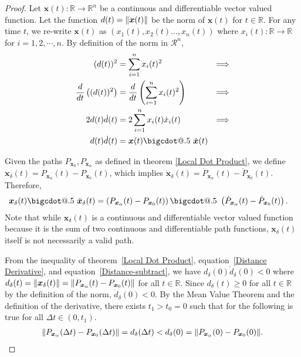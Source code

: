 \documentclass{article}
\makeatletter
\newcommand{\B}[1]{\boldsymbol{#1}}
\newcommand*\bigcdot{\mathpalette\bigcdot@{.5}}
\newcommand*\bigcdot@[2]{\mathbin{\vcenter{\hbox{\scalebox{#2}{$\m@th#1\bullet$}}}}}
\DeclarePairedDelimiter\norm{\lVert}{\rVert}%
\theoremstyle{definition}
\theoremstyle{remark}
\makeatother
\begin{document}
\begin{proof}
  Let $\B{x}(t): \mathbb{R} \to \mathbb{R}^n$ be a continuous and differentiable vector valued
  function. Let the function $d(t) = \norm{\B{x}(t)}$ be the norm of $\B{x}(t)$ for $t \in \mathbb{R}$.
  For any time $t$, we re-write $\B{x}(t)$ as $\left( x_1(t), x_2(t)..., x_n(t) \right)$
  where $x_i(t) : \mathbb{R} \to \mathbb{R}$ for $i = 1, 2, \cdots, n$. By definition of the norm in $\mathcal{R}^n$,
  \begin{align}
    (d(t))^2 &= \sum_{i=1}^n x_i(t)^2 & \Longrightarrow \nonumber\\
    \frac{d}{dt} \left((d(t))^2\right) &= \frac{d}{dt} \left(\sum_{i=1}^n x_i(t)^2\right)  & \Longrightarrow \nonumber\\
    2d(t)\dot{d}(t) &= 2\sum_{i=1}^n x_i(t)\dot{x}_i(t)  & \Longrightarrow \nonumber\\
    d(t)\dot{d}(t) &=  \B{x}(t)  \bigcdot~ \dot{\B{x}}(t) \label{Distance Derivative}
  \end{align}

  Given the paths $P_{\B{x}_0}, P_{\B{x}_\alpha}$ as defined in theorem \ref{Local Dot Product},
  we define $\B{x}_\delta(t) = P_{\B{x}_\alpha}(t) - P_{\B{x}_0}(t)$, which implies
  $\dot{\B{x}}_\delta(t) = \dot{P}_{\B{x}_\alpha}(t) - \dot{P}_{\B{x}_0}(t)$.
  Therefore,
  \begin{align}
  \B{x}_\delta(t) \bigcdot~  \dot{\B{x}}_\delta(t) & = \left(P_{\B{x}_\alpha}(t) - P_{\B{x}_0}(t)\right) \bigcdot~ \left( \dot{P}_{\B{x}_\alpha}(t) - \dot{P}_{\B{x}_0}(t)\right).\label{Distance-subtract}
  \end{align}
  Note that while $\B{x}_\delta(t)$ is a continuous and differentiable vector valued function because it is the sum
  of two continuous and differentiable path functions, $\B{x}_\delta(t)$ itself is not necessarily a valid path.

  From the inequality of theorem~\ref{Local Dot Product}, equation~\ref{Distance Derivative}, and equation~\ref{Distance-subtract},
  we have $d_\delta(0)\dot{d}_\delta(0) < 0$ where $d_\delta(t) = \norm{\B{x}_\delta(t)} = \norm{P_{\B{x}_\alpha}(t) - P_{\B{x}_0}(t)}$
  for all $t \in \mathbb{R}$. Since $d_\delta(t) \geq 0$ for all $t \in \mathbb{R}$ by the definition of the norm,
  $\dot{d}_\delta(0) < 0$. By the Mean Value Theorem \cite{AdvancedCalculus}
  and the definition of the derivative, there exists $t_1 > t_0=0$ such that for the following is true for all 
  $\Delta t \in \left(0, t_1\right)$.
  \begin{align}
  \norm{P_{\B{x}_\alpha}(\Delta t) - P_{\B{x}_0}(\Delta t)} = d_\delta(\Delta t) < d_\delta(0) = \norm{P_{\B{x}_\alpha}(0) - P_{\B{x}_0}(0)}.\label{attractive-condition}
  \end{align}
    

\end{proof}
\end{document}
